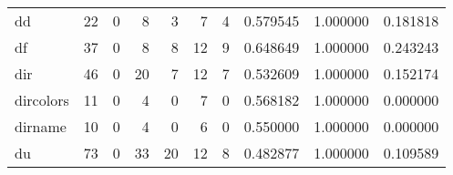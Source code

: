 \begin{longtable}{lrrrrrrrrr}
dd        &                                       22 &                                                  0 &                                                  8 &                                                  3 &                                                  7 &                                                  4 &                                           0.579545 &                               1.000000 &                             0.181818 \\
df        &                                       37 &                                                  0 &                                                  8 &                                                  8 &                                                 12 &                                                  9 &                                           0.648649 &                               1.000000 &                             0.243243 \\
dir       &                                       46 &                                                  0 &                                                 20 &                                                  7 &                                                 12 &                                                  7 &                                           0.532609 &                               1.000000 &                             0.152174 \\
dircolors &                                       11 &                                                  0 &                                                  4 &                                                  0 &                                                  7 &                                                  0 &                                           0.568182 &                               1.000000 &                             0.000000 \\
dirname   &                                       10 &                                                  0 &                                                  4 &                                                  0 &                                                  6 &                                                  0 &                                           0.550000 &                               1.000000 &                             0.000000 \\
du        &                                       73 &                                                  0 &                                                 33 &                                                 20 &                                                 12 &                                                  8 &                                           0.482877 &                               1.000000 &                             0.109589 \\

\end{longtable}

